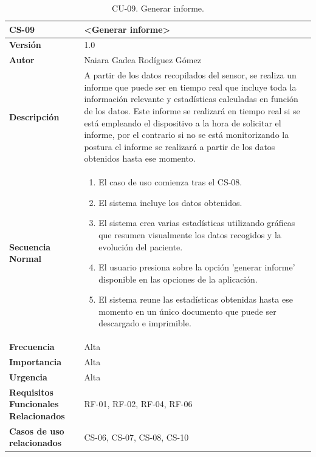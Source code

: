 
\begin{table}[h!]
\centering
\begin{tabular}{ |m{3cm}|m{11cm}|  } 
\hline
\cellcolor[HTML]{B9E3F0}\textbf{CS-09} & \cellcolor[HTML]{B9E3F0}\textbf{<Generar informe>}\\

\hline
\cellcolor[HTML]{EFEFEF}\textbf{Versión}             & 1.0  \\
\hline
\cellcolor[HTML]{EFEFEF}\textbf{Autor}                & Naiara Gadea Rodíguez Gómez\\
\hline
\cellcolor[HTML]{EFEFEF}\textbf{Descripción}                & {A partir de los datos recopilados del sensor, se realiza un informe que puede ser en tiempo real que incluye toda la información relevante y estadísticas calculadas en función de los datos. Este informe se realizará en tiempo real si se está empleando el dispositivo a la hora de solicitar el informe, por el contrario si no se está monitorizando la postura el informe se realizará a partir de los datos obtenidos hasta ese momento.}\\
\hline
\cellcolor[HTML]{EFEFEF}\textbf{Secuencia \newline Normal}                &                 
        \begin{enumerate}
			\def\labelenumi{\arabic{enumi}.}
			\tightlist
			\item El caso de uso comienza tras el CS-08.
			\item El sistema incluye los datos obtenidos. 
                \item El sistema crea varias estadísticas utilizando gráficas que resumen visualmente los datos recogidos y la evolución del paciente.
                \item El usuario presiona sobre la opción 'generar informe' disponible en las opciones de la aplicación.
                \item El sistema reune las estadísticas obtenidas hasta ese momento en un único documento que puede ser descargado e imprimible.
                
		\end{enumerate}\\
\hline
\cellcolor[HTML]{EFEFEF}\textbf{Frecuencia}                & Alta\\
\hline
\cellcolor[HTML]{EFEFEF}\textbf{Importancia}                & Alta\\
\hline
\cellcolor[HTML]{EFEFEF}\textbf{Urgencia}                & Alta\\
\hline
\cellcolor[HTML]{EFEFEF}\textbf{Requisitos Funcionales Relacionados}                & {RF-01, RF-02, RF-04, RF-06 }\\
\hline
\cellcolor[HTML]{EFEFEF}\textbf{Casos de uso relacionados}                & {CS-06, CS-07, CS-08, CS-10 }\\
\hline
\end{tabular}
\caption{CU-09. Generar informe.}
\end{table}


